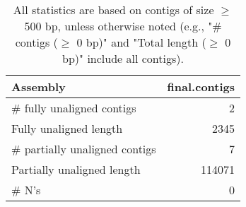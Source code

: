 \documentclass[12pt,a4paper]{article}
\begin{document}
\begin{table}[ht]
\begin{center}
\caption{All statistics are based on contigs of size $\geq$ 500 bp, unless otherwise noted (e.g., "\# contigs ($\geq$ 0 bp)" and "Total length ($\geq$ 0 bp)" include all contigs).}
\begin{tabular}{|l*{1}{|r}|}
\hline
Assembly & final.contigs \\ \hline
\# fully unaligned contigs & 2 \\ \hline
Fully unaligned length & 2345 \\ \hline
\# partially unaligned contigs & 7 \\ \hline
Partially unaligned length & 114071 \\ \hline
\# N's & 0 \\ \hline
\end{tabular}
\end{center}
\end{table}
\end{document}
